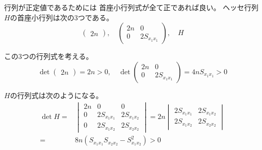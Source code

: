 \documentclass[12pt,b5paper]{ltjsarticle}
\begin{document}
\begin{enumerate}
\begin{enumerate}
            行列が正定値であるためには
            首座小行列式が全て正であれば良い。
            ヘッセ行列$H$の首座小行列は次の3つである。
            \begin{equation}
             \begin{pmatrix}
              2n
             \end{pmatrix}
             ,\quad
             \begin{pmatrix}
              2n & 0\\
              0 & 2S_{x_1x_1}
             \end{pmatrix}
             ,\quad H
            \end{equation}

            この3つの行列式を考える。
            \begin{equation}
             \det \begin{pmatrix} 2n \end{pmatrix}
             = 2n >0
              ,\quad
              \det
             \begin{pmatrix}
              2n & 0\\
              0 & 2S_{x_1x_1}
             \end{pmatrix}
             =4n S_{x_1x_1} >0
            \end{equation}

            $H$の行列式は次のようになる。
            \begin{align}
             \det H =&
              \begin{vmatrix}
               2n & 0 & 0\\
               0
               & 2 S_{x_1x_1}%
               & 2 S_{x_1x_2}\\%
               0
               & 2 S_{x_1x_2}%
               & 2 S_{x_2x_2}%
              \end{vmatrix}
              = 2n
              \begin{vmatrix}
               2 S_{x_1x_1}%
               & 2 S_{x_1x_2}\\%
               2 S_{x_1x_2}%
               & 2 S_{x_2x_2}%
              \end{vmatrix}\\
              =& 8n(S_{x_1x_1}S_{x_2x_2}-S_{x_1x_2}^2) >0
            \end{align}


\end{enumerate}
\end{enumerate}
\end{document}
